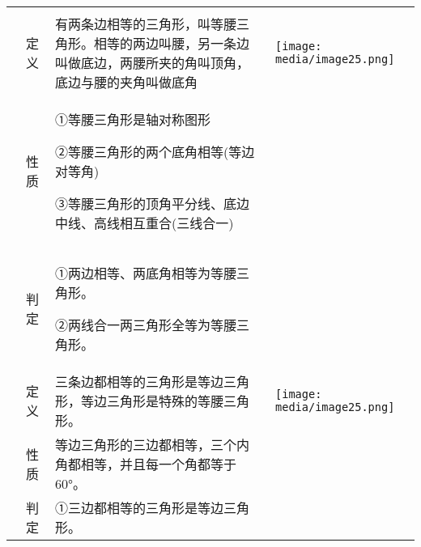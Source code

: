 \documentclass[a4paper,11pt,UTF8]{ctexart}
\begin{document}
\begin{longtable}[]{@{}llll@{}}
\toprule
\endhead
& & &\tabularnewline
& 定义 &
有两条边相等的三角形，叫等腰三角形。相等的两边叫腰，另一条边叫做底边，两腰所夹的角叫顶角，底边与腰的夹角叫做底角
&
\texttt{[image: media/image25.png]}\tabularnewline
\begin{minipage}[t]{0.22\columnwidth}\raggedright
\strut
\end{minipage} & \begin{minipage}[t]{0.22\columnwidth}\raggedright
性质\strut
\end{minipage} & \begin{minipage}[t]{0.22\columnwidth}\raggedright
①等腰三角形是轴对称图形

②等腰三角形的两个底角相等(等边对等角)

③等腰三角形的顶角平分线、底边中线、高线相互重合(三线合一)\strut
\end{minipage} & \begin{minipage}[t]{0.22\columnwidth}\raggedright
\strut
\end{minipage}\tabularnewline
\begin{minipage}[t]{0.22\columnwidth}\raggedright
\strut
\end{minipage} & \begin{minipage}[t]{0.22\columnwidth}\raggedright
判定\strut
\end{minipage} & \begin{minipage}[t]{0.22\columnwidth}\raggedright
①两边相等、两底角相等为等腰三角形。

②两线合一两三角形全等为等腰三角形。\strut
\end{minipage} & \begin{minipage}[t]{0.22\columnwidth}\raggedright
\strut
\end{minipage}\tabularnewline
& 定义 &
三条边都相等的三角形是等边三角形，等边三角形是特殊的等腰三角形。 &
\texttt{[image: media/image25.png]}\tabularnewline
& 性质 & 等边三角形的三边都相等，三个内角都相等，并且每一个角都等于60°。
&\tabularnewline
\begin{minipage}[t]{0.22\columnwidth}\raggedright
\strut
\end{minipage} & \begin{minipage}[t]{0.22\columnwidth}\raggedright
判定\strut
\end{minipage} & \begin{minipage}[t]{0.22\columnwidth}\raggedright
①三边都相等的三角形是等边三角形。


\end{minipage}
\end{longtable}
\end{document}
